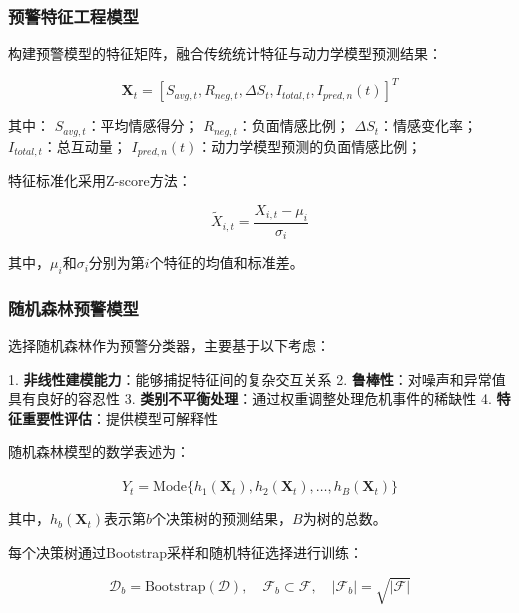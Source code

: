 \documentclass[withoutpreface,bwprint]{cumcmthesis}
\begin{document}
\subsubsection{预警特征工程模型}

构建预警模型的特征矩阵，融合传统统计特征与动力学模型预测结果：

\begin{equation}
\label{eq:feature_matrix}
\mathbf{X}_t = [S_{avg,t}, R_{neg,t}, \Delta S_t, I_{total,t}, I_{pred,n}(t)]^T
\end{equation}

其中：
 $S_{avg,t}$：平均情感得分；
 $R_{neg,t}$：负面情感比例；
 $\Delta S_t$：情感变化率；
 $I_{total,t}$：总互动量；
 $I_{pred,n}(t)$：动力学模型预测的负面情感比例；

特征标准化采用Z-score方法：

\begin{equation}
\label{eq:feature_normalization}
\tilde{X}_{i,t} = \frac{X_{i,t} - \mu_i}{\sigma_i}
\end{equation}

其中，$\mu_i$和$\sigma_i$分别为第$i$个特征的均值和标准差。

\subsubsection{随机森林预警模型}

选择随机森林作为预警分类器，主要基于以下考虑：

1. \textbf{非线性建模能力}：能够捕捉特征间的复杂交互关系
2. \textbf{鲁棒性}：对噪声和异常值具有良好的容忍性
3. \textbf{类别不平衡处理}：通过权重调整处理危机事件的稀缺性
4. \textbf{特征重要性评估}：提供模型可解释性

随机森林模型的数学表述为：

\begin{equation}
\label{eq:random_forest}
\hat{Y}_t = \text{Mode}\{h_1(\mathbf{X}_t), h_2(\mathbf{X}_t), \ldots, h_B(\mathbf{X}_t)\}
\end{equation}

其中，$h_b(\mathbf{X}_t)$表示第$b$个决策树的预测结果，$B$为树的总数。

每个决策树通过Bootstrap采样和随机特征选择进行训练：

\begin{equation}
\label{eq:bootstrap_sampling}
\mathcal{D}_b = \text{Bootstrap}(\mathcal{D}), \quad \mathcal{F}_b \subset \mathcal{F}, \quad |\mathcal{F}_b| = \sqrt{|\mathcal{F}|}
\end{equation}
\end{document}
